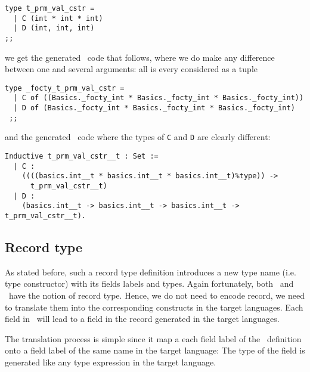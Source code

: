 {\footnotesize
\begin{lstlisting}[title=Value constructor parameterised by
  ``several'' arguments (2)]
type t_prm_val_cstr =
  | C (int * int * int)
  | D (int, int, int)
;;
\end{lstlisting}}

\noindent we get the generated \ocaml\ code that follows, where we do
make any difference between one and several arguments: all is every considered
as a tuple

{\footnotesize
\begin{lstlisting}[language=MyOCaml,
                   title=Value constructor parameterised by
                   ``several'' arguments in \ocaml\ (2)]
type _focty_t_prm_val_cstr = 
  | C of ((Basics._focty_int * Basics._focty_int * Basics._focty_int))
  | D of (Basics._focty_int * Basics._focty_int * Basics._focty_int)
 ;;
\end{lstlisting}}

\noindent and the generated \coq\ code where the types of {\tt C} and {\tt D}
are clearly different:

{\footnotesize
\begin{lstlisting}[language=MyCoq,
                   title=Value constructor parameterised by
                   ``several'' arguments in \coq\ (2)]
Inductive t_prm_val_cstr__t : Set := 
  | C :
    ((((basics.int__t * basics.int__t * basics.int__t)%type)) ->
      t_prm_val_cstr__t)
  | D :
    (basics.int__t -> basics.int__t -> basics.int__t -> t_prm_val_cstr__t).
\end{lstlisting}}



\subsection{Record type}
As stated before, such a record type definition introduces a new type
name (i.e. type constructor) with its fields labels and types. Again
fortunately, both \ocaml\ and \coq\ have the notion of record
type. Hence, we do not need to encode record, we need to translate them
into the corresponding constructs in the target languages. Each field
in \focalize\ will lead to a field in the record generated in the
target languages.

The translation process is simple since it map a each field label of
the \focalize\ definition onto a field label of the same name in the
target language: The type of the field is generated like any type
expression in the target language.

